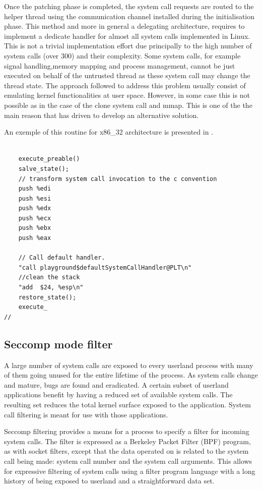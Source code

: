 Once the patching phase is completed, the system call requests are routed to the helper thread using the communication channel installed during the initialisation phase. This method and more in general a delegating architecture, requires to implement a dedicate handler for almost all system calls implemented in Linux. This is not a trivial implementation effort due principally to the high number of system calls (over 300) and their complexity. Some system calls, for example signal handling,memory mapping and process management, cannot be just executed on behalf of the untrusted thread as these system call may change the thread state.
The approach followed to address this problem usually consist of emulating kernel functionalities  at user space. However, in some case this is not possible as in the case of the clone system call and mmap. This is  one of the the main reason that has driven to develop an alternative solution.   

An exemple of this routine for x86\_32 architecture is presented in . 

\begin{lstlisting} 
	
	execute_preable()
	salve_state(); 
	// transform system call invocation to the c convention	
 	push %edi
    push %esi
    push %edx
    push %ecx
    push %ebx
    push %eax
    
    // Call default handler.
 	"call playground$defaultSystemCallHandler@PLT\n"
 	//clean the stack
 	"add  $24, %esp\n"
    restore_state(); 
    execute_
//

\end{lstlisting}

\subsection{Seccomp mode filter}
\label{filter}
           
           A large number of system calls are exposed to every userland process
with many of them going unused for the entire lifetime of the process.
As system calls change and mature, bugs are found and eradicated.  A
certain subset of userland applications benefit by having a reduced set
of available system calls.  The resulting set reduces the total kernel
surface exposed to the application.  System call filtering is meant for
use with those applications.

Seccomp filtering provides a means for a process to specify a filter for
incoming system calls.  The filter is expressed as a Berkeley Packet
Filter (BPF) program, as with socket filters, except that the data
operated on is related to the system call being made: system call
number and the system call arguments.  This allows for expressive
filtering of system calls using a filter program language with a long
history of being exposed to userland and a straightforward data set.

